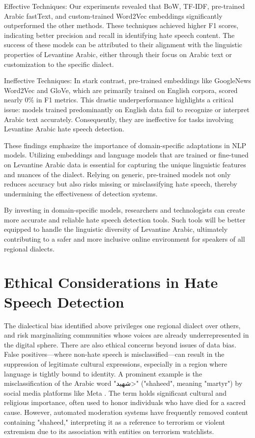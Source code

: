 \documentclass[11pt]{article}
\begin{document}
Effective Techniques: Our experiments revealed that BoW, TF-IDF, pre-trained Arabic fastText, and custom-trained Word2Vec embeddings significantly outperformed the other methods. These techniques achieved higher F1 scores, indicating better precision and recall in identifying hate speech content. The success of these models can be attributed to their alignment with the linguistic properties of Levantine Arabic, either through their focus on Arabic text or customization to the specific dialect.

Ineffective Techniques: In stark contrast, pre-trained embeddings like GoogleNews Word2Vec and GloVe, which are primarily trained on English corpora, scored nearly 0\% in F1 metrics. This drastic underperformance highlights a critical issue: models trained predominantly on English data fail to recognize or interpret Arabic text accurately. Consequently, they are ineffective for tasks involving Levantine Arabic hate speech detection.

These findings emphasize the importance of domain-specific adaptations in NLP models. Utilizing embeddings and language models that are trained or fine-tuned on Levantine Arabic data is essential for capturing the unique linguistic features and nuances of the dialect. Relying on generic, pre-trained models not only reduces accuracy but also risks missing or misclassifying hate speech, thereby undermining the effectiveness of detection systems.

By investing in domain-specific models, researchers and technologists can create more accurate and reliable hate speech detection tools. Such tools will be better equipped to handle the linguistic diversity of Levantine Arabic, ultimately contributing to a safer and more inclusive online environment for speakers of all regional dialects.


\section{Ethical Considerations in Hate Speech Detection}
The dialectical bias identified above privileges one regional dialect over others, and risk marginalizing communities whose voices are already underrepresented in the digital sphere. There are also ethical concerns beyond issues of data bias. False positives—where non-hate speech is misclassified—can result in the suppression of legitimate cultural expressions, especially in a region where language is tightly bound to identity. A prominent example is the misclassification of the Arabic word "\<شهيد>" ("shaheed", meaning "martyr") by social media platforms like Meta \citep{oversightboard_shaheed_2024}. The term holds significant cultural and religious importance, often used to honor individuals who have died for a sacred cause. However, automated moderation systems have frequently removed content containing "shaheed," interpreting it as a reference to terrorism or violent extremism due to its association with entities on terrorism watchlists. 
\end{document}
